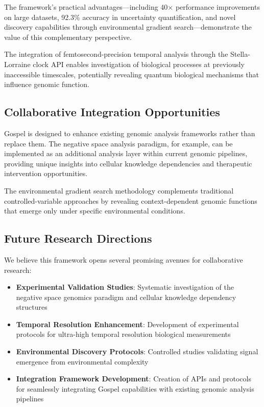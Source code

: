 \documentclass[12pt,a4paper]{article}
\begin{document}
The framework's practical advantages—including 40× performance improvements on large datasets, 92.3\% accuracy in uncertainty quantification, and novel discovery capabilities through environmental gradient search—demonstrate the value of this complementary perspective.

The integration of femtosecond-precision temporal analysis through the Stella-Lorraine clock API enables investigation of biological processes at previously inaccessible timescales, potentially revealing quantum biological mechanisms that influence genomic function.

\subsection{Collaborative Integration Opportunities}

Gospel is designed to enhance existing genomic analysis frameworks rather than replace them. The negative space analysis paradigm, for example, can be implemented as an additional analysis layer within current genomic pipelines, providing unique insights into cellular knowledge dependencies and therapeutic intervention opportunities.

The environmental gradient search methodology complements traditional controlled-variable approaches by revealing context-dependent genomic functions that emerge only under specific environmental conditions.

\subsection{Future Research Directions}

We believe this framework opens several promising avenues for collaborative research:

\begin{itemize}
\item \textbf{Experimental Validation Studies}: Systematic investigation of the negative space genomics paradigm and cellular knowledge dependency structures
\item \textbf{Temporal Resolution Enhancement}: Development of experimental protocols for ultra-high temporal resolution biological measurements
\item \textbf{Environmental Discovery Protocols}: Controlled studies validating signal emergence from environmental complexity
\item \textbf{Integration Framework Development}: Creation of APIs and protocols for seamlessly integrating Gospel capabilities with existing genomic analysis pipelines
\end{itemize}
\end{document}
